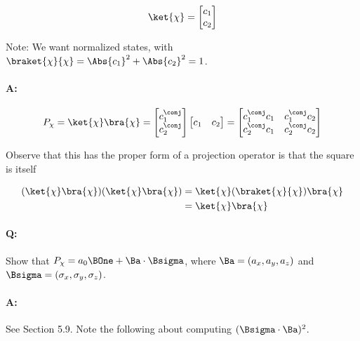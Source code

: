 \begin{equation}\label{eqn:PHY356HNov2:120}
\begin{aligned}
\ket{\chi} =
\begin{bmatrix}
c_1 \\
c_2
\end{bmatrix}
\end{aligned}
\end{equation}

Note: We want normalized states, with $\braket{\chi}{\chi} = \Abs{c_1}^2 + \Abs{c_2}^2 = 1$.


\paragraph{A:}

\begin{equation}\label{eqn:PHY356HNov2:130}
\begin{aligned}
P_{\chi} = \ket{\chi}\bra{\chi} =
\begin{bmatrix}
c_1^\conj \\
c_2^\conj
\end{bmatrix}
\begin{bmatrix}
c_1 & c_2
\end{bmatrix}
=
\begin{bmatrix}
c_1^\conj c_1 & c_1^\conj c_2 \\
c_2^\conj c_1 & c_2^\conj c_2
\end{bmatrix}
\end{aligned}
\end{equation}

Observe that this has the proper form of a projection operator is that the square is itself

\begin{equation}\label{eqn:lecture8makingSenseOfQM:1140}
\begin{aligned}
(\ket{\chi}\bra{\chi}) (\ket{\chi}\bra{\chi})
&= \ket{\chi} (\braket{\chi}{\chi} )\bra{\chi} \\
&= \ket{\chi} \bra{\chi}
\end{aligned}
\end{equation}

\paragraph{Q:} Show that $P_{\chi} = a_0 \BOne + \Ba \cdot \Bsigma$, where $\Ba = (a_x, a_y, a_z)$ and $\Bsigma = (\sigma_x, \sigma_y, \sigma_z)$.

\paragraph{A:} See Section 5.9.  Note the following about computing $(\Bsigma \cdot \Ba)^2$.

